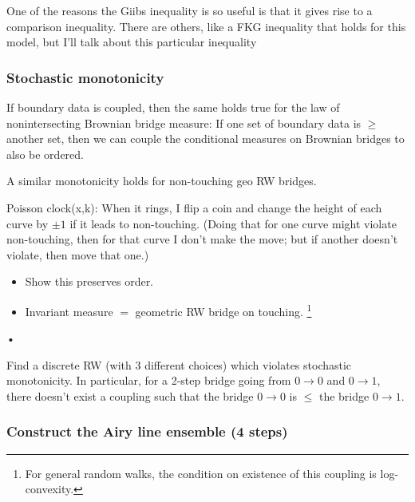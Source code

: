 One of the reasons the Giibs inequality is so useful is that it gives rise to a comparison inequality. 
There are others, like a FKG inequality that holds for this model, but I'll talk about this particular inequality
\subsubsection{Stochastic monotonicity}

If boundary data is coupled, then the same holds true for the law of nonintersecting Brownian bridge measure:
If one set of boundary data is $\ge$ another set, then we can couple the conditional measures on Brownian bridges to also be ordered.

A similar monotonicity holds for non-touching geo RW bridges.

Poisson clock(x,k): When it rings, I flip a coin and change the height of each curve by $\pm 1$ if it leads to non-touching.
(Doing that for one curve might violate non-touching, then for that curve I don't make the move; but if another doesn't violate, then move that one.)
\begin{exr}
\begin{itemize}
\item
Show this preserves order.
\item
Invariant measure $=$ geometric RW bridge on touching.
\footnote{For general random walks, the condition on existence of this coupling is log-convexity.}
\end{itemize}•
\end{exr}
\begin{exr}
Find a discrete RW (with 3 different choices) which violates stochastic monotonicity. In particular, for a 2-step bridge going from $0\to 0$ and $0\to 1$, there doesn't exist a coupling such that the bridge $0\to 0$ is $\le$ the bridge $0\to 1$.
\end{exr}
%

\subsubsection{Construct the Airy line ensemble (4 steps)}

